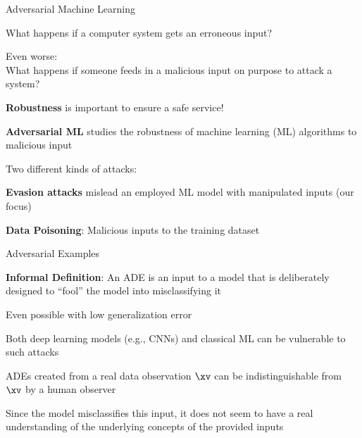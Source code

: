 \documentclass[10pt,compress,t,notes=noshow, xcolor=table]{beamer}
\begin{document}
\newcommand{\vertiii}[1]{{\left\vert\kern-0.25ex\left\vert\kern-0.25ex\left\vert #1 \right\vert\kern-0.25ex\right\vert\kern-0.25ex\right\vert}}





\begin{framei}[align=top]{Adversarial Machine Learning}
\item What happens if a computer system gets an erroneous input?
\item Even worse:\\ What happens if someone feeds in a malicious input on purpose to attack a system?
\item[$\leadsto$] \textbf{Robustness} is important to ensure a safe service!
\item \textbf{Adversarial ML} studies the robustness of machine learning (ML) algorithms to malicious input
\item Two different kinds of attacks:
\begin{itemizeS}
\item \textbf{Evasion attacks} mislead an employed ML model with manipulated inputs (our focus)
\item \textbf{Data Poisoning}: Malicious inputs to the training dataset
\end{itemizeS}
\end{framei}


\begin{framei}[align=top]{Adversarial Examples}
\item \textbf{Informal Definition}: An ADE is an input to a model that is deliberately designed to ``fool'' the model into misclassifying it
\item Even possible with low generalization error
\item Both deep learning models (e.g., CNNs) and classical ML can be vulnerable to such attacks
\item ADEs created from a real data observation $\xv$ can be indistinguishable from $\xv$ by a human observer
\item Since the model misclassifies this input, it does not seem to have a real understanding of the underlying concepts of the provided inputs
\end{framei}
\end{document}
